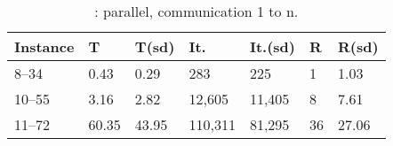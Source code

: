 \begin{table}[h]
	\centering 
	\renewcommand{\arraystretch}{1}
	\begin{tabular}{p{2cm}|R{1.2cm}R{1.2cm}|R{1.5cm}R{1.5cm}|R{0.8cm}R{1.2cm}}
		\hline 	
		{\bf Instance} & T & T(sd) & It. & It.(sd) & R & R(sd)\\
		\hline
		8--34 & 0.43 & 0.29 & 283 & 225 & 1 & 1.03\\
		10--55 & 3.16 & 2.82 & 12,605 & 11,405 & 8 & 7.61\\
		11--72 & 60.35 & 43.95 & 110,311 & 81,295 & 36 & 27.06\\
		\hline
	\end{tabular}
	\caption{\gr: parallel, communication 1 to n.}
	\label{tab:golomb_par_1-n}
\end{table}
